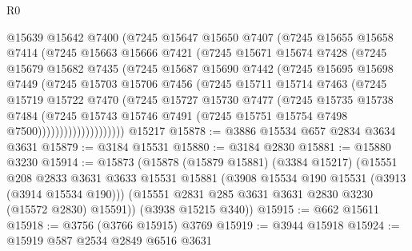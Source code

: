 \begin{lexlean}{R0}
\begin{coremodule}
                @15639
                @15642
                @7400
                (@7245
                  @15647
                  @15650
                  @7407
                  (@7245
                    @15655
                    @15658
                    @7414
                    (@7245
                      @15663
                      @15666
                      @7421
                      (@7245
                        @15671
                        @15674
                        @7428
                        (@7245
                          @15679
                          @15682
                          @7435
                          (@7245
                            @15687
                            @15690
                            @7442
                            (@7245
                              @15695
                              @15698
                              @7449
                              (@7245
                                @15703
                                @15706
                                @7456
                                (@7245
                                  @15711
                                  @15714
                                  @7463
                                  (@7245
                                    @15719
                                    @15722
                                    @7470
                                    (@7245
                                      @15727
                                      @15730
                                      @7477
                                      (@7245
                                        @15735
                                        @15738
                                        @7484
                                        (@7245
                                          @15743
                                          @15746
                                          @7491
                                          (@7245 @15751 @15754 @7498 @7500))))))))))))))))))))
    @15217
@15878 := @3886 @15534 @657 @2834 @3634 @3631
@15879 := @3184 @15531
@15880 := @3184 @2830
@15881 := @15880 @3230
@15914 := @15873
    (@15878
      (@15879 @15881)
      (@3384 @15217)
      (@15551
        @208
        @2833
        @3631
        @3633
        @15531
        @15881
        (@3908 @15534 @190 @15531 (@3913 (@3914 @15534 @190)))
        (@15551 @2831 @285 @3631 @3631 @2830 @3230 (@15572 @2830) @15591))
      (@3938 @15215 @340))
@15915 := @662 @15611
@15918 := @3756 (@3766 @15915) @3769
@15919 := @3944 @15918
@15924 := @15919 @587 @2534 @2849 @6516 @3631

\end{coremodule}
\end{lexlean}
